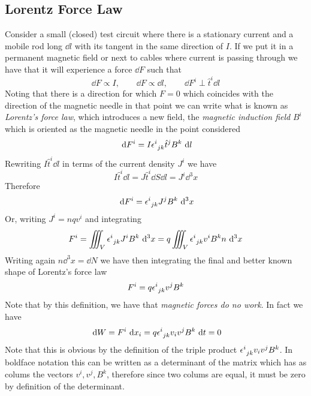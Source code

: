 \documentclass[../electromagnetism]{subfiles}
\begin{document}
\subsection{Lorentz Force Law}
Consider a small (closed) test circuit where there is a stationary current and a mobile rod long $\dd l$ with its tangent in the same direction of $I$. If we put it in a permanent magnetic field or next to cables where current is passing through we have that it will experience a force $\dd F$ such that
\begin{equation}
	\dd F\propto I,\qquad\dd F\propto\dd l,\qquad\dd F^i\perp \hat{t}^i\dd l
	\label{eq:lorenceforceder}
\end{equation}
Noting that there is a direction for which $F=0$ which coincides with the direction of the magnetic needle in that point we can write what is known as \textit{Lorentz's force law}, which introduces a new field, the \textit{magnetic induction field}  $B^i$ which is oriented as the magnetic needle in the point considered
\begin{equation}
	\ \mathrm{d} F^i=I\epsilon^{i}_{\ jk}\hat{t}^jB^k\ \mathrm{d} l
	\label{eq:lorentzforceoperational}
\end{equation}
Rewriting $I\hat{t}^i\dd l$ in terms of the current density $J^i$ we have
\begin{equation*}
	I\hat{t}^i\dd l=J\hat{t}^i\dd S\dd l=J^i\dd^3x
\end{equation*}
Therefore
\begin{equation}
	\ \mathrm{d} F^i=\epsilon^{i}_{\ jk}J^jB^k\ \mathrm{d}^3x
	\label{eq:lorforcediffvol}
\end{equation}
Or, writing $J^i=nqv^i$ and integrating
\begin{equation*}
	F^i=\iiint_V\epsilon^{i}_{\ jk}J^iB^k\ \mathrm{d}^3x=q\iiint_V\epsilon^{i}_{\ jk}v^iB^kn\ \mathrm{d}^3x
\end{equation*}
Writing again $n\dd^3x=\dd N$ we have then integrating the final and better known shape of Lorentz's force law
\begin{equation}
	F^i=q\epsilon^{i}_{\ jk}v^jB^k
	\label{eq:lorenzforce}
\end{equation}
Note that by this definition, we have that \textit{magnetic forces do no work}. In fact we have
\begin{equation}
	\ \mathrm{d} W=F^i\ \mathrm{d} x_i=q\epsilon^{i}_{\ jk}v_iv^jB^k\ \mathrm{d} t=0
	\label{eq:workmag}
\end{equation}
Note that this is obvious by the definition of the triple product $\epsilon^{i}_{\ jk}v_iv^jB^k$. In boldface notation this can be written as a determinant of the matrix which has as colums the vectors $v^i,v^j,B^k$, therefore since two colums are equal, it must be zero by definition of the determinant.\\
\end{document}
